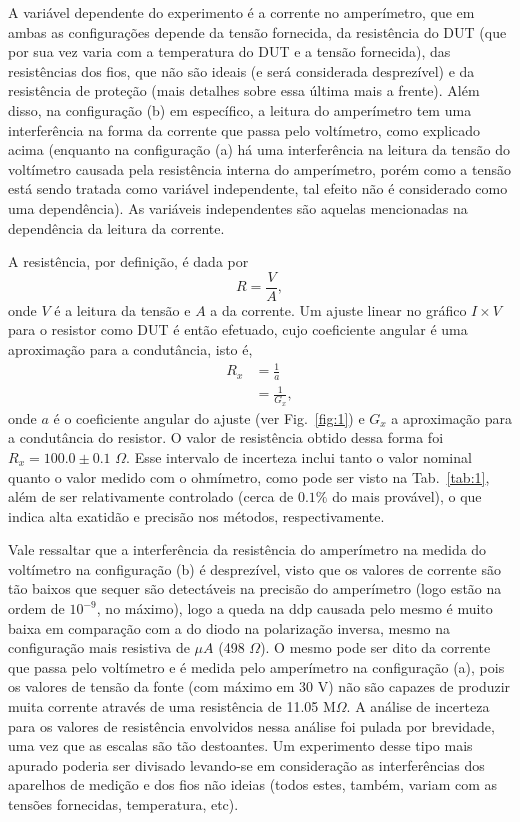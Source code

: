 A variável dependente do experimento é a corrente no amperímetro, que em ambas as configurações depende da tensão fornecida, da resistência do DUT (que por sua vez varia com a temperatura do DUT e a tensão fornecida), das resistências dos fios, que não são ideais (e será considerada desprezível) e da resistência de proteção (mais detalhes sobre essa última mais a frente). Além disso, na configuração (b) em específico, a leitura do amperímetro tem uma interferência na forma da corrente que passa pelo voltímetro, como explicado acima (enquanto na configuração (a) há uma interferência na leitura da tensão do voltímetro causada pela resistência interna do amperímetro, porém como a tensão está sendo tratada como variável independente, tal efeito não é considerado como uma dependência). As variáveis independentes são aquelas mencionadas na dependência da leitura da corrente.

A resistência, por definição, é dada por
\begin{equation}
    \label{resis}
    R=\frac{V}{A},
\end{equation}
onde $V$ é a leitura da tensão e $A$ a da corrente. Um ajuste linear no gráfico $I\times V$ para o resistor como DUT é então efetuado, cujo coeficiente angular é uma aproximação para a condutância, isto é,
\begin{align}
    \label{Rx}
    R_x&=\frac{1}{a}\\
    &=\frac{1}{G_x} \nonumber,
\end{align}
onde $a$ é o coeficiente angular do ajuste (ver Fig.~\ref{fig:1}) e $G_x$ a aproximação para a condutância do resistor. O valor de resistência obtido dessa forma foi $R_x=100.0\pm0.1$ $\Omega$. Esse intervalo de incerteza inclui tanto o valor nominal quanto o valor medido com o ohmímetro, como pode ser visto na Tab.~\ref{tab:1}, além de ser relativamente controlado (cerca de $0.1\%$ do mais provável), o que indica alta exatidão e precisão nos métodos, respectivamente.

Vale ressaltar que a interferência da resistência do amperímetro na medida do voltímetro na configuração (b) é desprezível, visto que os valores de corrente são tão baixos que sequer são detectáveis na precisão do amperímetro (logo estão na ordem de $10^{-9}$, no máximo), logo a queda na ddp causada pelo mesmo é muito baixa em comparação com a do diodo na polarização inversa, mesmo na configuração mais resistiva de $\mu A$ (498 $\Omega$). O mesmo pode ser dito da corrente que passa pelo voltímetro e é medida pelo amperímetro na configuração (a), pois os valores de tensão da fonte (com máximo em 30 V) não são capazes de produzir muita corrente através de uma resistência de 11.05 M$\Omega$. A análise de incerteza para os valores de resistência envolvidos nessa análise foi pulada por brevidade, uma vez que as escalas são tão destoantes. Um experimento desse tipo mais apurado poderia ser divisado levando-se em consideração as interferências dos aparelhos de medição e dos fios não ideias (todos estes, também, variam com as tensões fornecidas, temperatura, etc).


